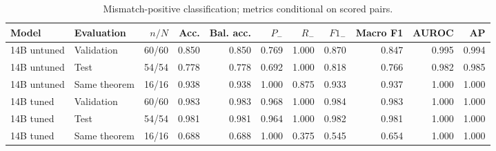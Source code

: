 \begin{table}[htbp]
\centering
\caption{Mismatch-positive classification; metrics conditional on scored pairs.}
\label{tab:related-swap-metrics}
\small
\begin{adjustbox}{max width=\textwidth}
\begin{tabular}{llrrrrrrrrr}
\toprule
Model & Evaluation & $n/N$ & Acc. & Bal. acc. & $P_-$ & $R_-$ & $F1_-$ & Macro F1 & AUROC & AP \\
\midrule
14B untuned & Validation & 60/60 & 0.850 & 0.850 & 0.769 & 1.000 & 0.870 & 0.847 & 0.995 & 0.994 \\
14B untuned & Test & 54/54 & 0.778 & 0.778 & 0.692 & 1.000 & 0.818 & 0.766 & 0.982 & 0.985 \\
14B untuned & Same theorem & 16/16 & 0.938 & 0.938 & 1.000 & 0.875 & 0.933 & 0.937 & 1.000 & 1.000 \\
14B tuned & Validation & 60/60 & 0.983 & 0.983 & 0.968 & 1.000 & 0.984 & 0.983 & 1.000 & 1.000 \\
14B tuned & Test & 54/54 & 0.981 & 0.981 & 0.964 & 1.000 & 0.982 & 0.981 & 1.000 & 1.000 \\
14B tuned & Same theorem & 16/16 & 0.688 & 0.688 & 1.000 & 0.375 & 0.545 & 0.654 & 1.000 & 1.000 \\
\bottomrule
\end{tabular}
\end{adjustbox}
\end{table}
